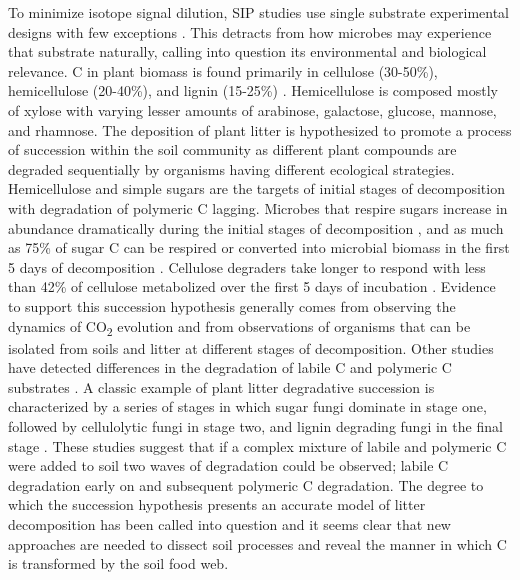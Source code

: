 To minimize isotope signal dilution, SIP studies use single substrate experimental designs with few exceptions \cite{Lueders_2003,Chauhan_2009}. This detracts from how microbes may experience that substrate naturally, calling into question its environmental and biological relevance. C in plant biomass is found primarily in cellulose (30-50\%), hemicellulose (20-40\%), and lignin (15-25\%) \cite{Lynd_2002}. Hemicellulose is composed mostly of xylose with varying lesser amounts of arabinose, galactose, glucose, mannose, and rhamnose. The deposition of plant litter is hypothesized to promote a process of succession within the soil community as different plant compounds are degraded sequentially by organisms having different ecological strategies. Hemicellulose and simple sugars are the targets of initial stages of decomposition with degradation of polymeric C lagging. Microbes that respire sugars increase in abundance dramatically during the initial stages of decomposition \cite{GARRETT_1951,Alexander_1964}, and as much as 75\% of sugar C can be respired or converted into microbial biomass in the first 5 days of decomposition \cite{Engelking_2007}. Cellulose degraders take longer to respond \cite{Hu_1997} with less than 42\% of cellulose metabolized over the first 5 days of incubation \cite{Engelking_2007}. Evidence to support this succession hypothesis generally comes from observing the dynamics of CO\textsubscript{2} evolution and from observations of organisms that can be isolated from soils and litter at different stages of decomposition. Other studies have detected differences in the degradation of labile C and polymeric C substrates \cite{Engelking_2007,Anderson_1973,Stotzky_1961,Alden_2001,Furukawa_1996,Fontaine_2003,Blagodatskaya_2007,Jenkins_2010,Rui_2009,Fierer_2010}. A classic example of plant litter degradative succession is characterized by a series of stages in which sugar fungi dominate in stage one, followed by cellulolytic fungi in stage two, and lignin degrading fungi in the final stage \cite{Gessner_2010}. These studies suggest that if a complex mixture of labile and polymeric C were added to soil two waves of degradation could be observed; labile C degradation early on and subsequent polymeric C degradation. The degree to which the succession hypothesis presents an accurate model of litter decomposition has been called into question \cite{Kj_ller_1982,Frankland_1998,Osono_2005} and it seems clear that new approaches are needed to dissect soil processes and reveal the manner in which C is transformed by the soil food web.  
 





